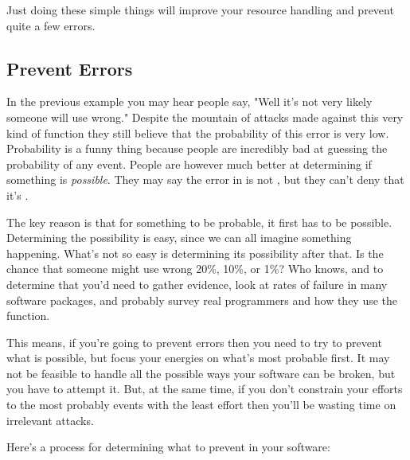 Just doing these simple things will improve your resource handling and prevent
quite a few errors.

\subsection{Prevent Errors}

In the previous example you may hear people say, "Well it's not very likely someone 
will use  wrong."  Despite the mountain of attacks made against this
very kind of function they still believe that the probability of this error is
very low.  Probability is a funny thing because people are incredibly bad at 
guessing the probability of any event.  People are however much better at
determining if something is \emph{possible}.  They may say the error in
 is not , but they can't deny that it's .

The key reason is that for something to be probable, it first has to be possible.
Determining the possibility is easy, since we can all imagine something happening.
What's not so easy is determining its possibility after that.  Is the chance that
someone might use  wrong 20\%, 10\%, or 1\%?  Who knows, and to
determine that you'd need to gather evidence, look at rates of failure in many
software packages, and probably survey real programmers and how they use the
function.

This means, if you're going to prevent errors then you need to try to prevent
what is possible, but focus your energies on what's most probable first.  It 
may not be feasible to handle all the possible ways your software can be broken,
but you have to attempt it.  But, at the same time, if you don't constrain
your efforts to the most probably events with the least effort then you'll be
wasting time on irrelevant attacks.

Here's a process for determining what to prevent in your software:

